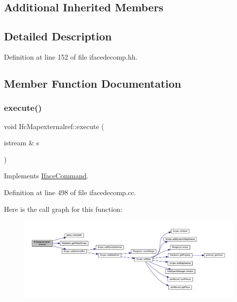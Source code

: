 \subsection*{Additional Inherited Members}


\subsection{Detailed Description}


Definition at line 152 of file ifacedecomp.\+hh.



\subsection{Member Function Documentation}
\mbox{\label{class_ifc_mapexternalref_a81048b8beac5fa5bfd987a4ac3a5b6b1}} 
\subsubsection{\texorpdfstring{execute()}{execute()}}
{\footnotesize\ttfamily void Ifc\+Mapexternalref\+::execute (\begin{DoxyParamCaption}\item[{istream \&}]{s }\end{DoxyParamCaption})\hspace{0.3cm}{\ttfamily [virtual]}}



Implements \mbox{\hyperlink{class_iface_command_af10e29cee2c8e419de6efe9e680ad201}{Iface\+Command}}.



Definition at line 498 of file ifacedecomp.\+cc.

Here is the call graph for this function\+:
\nopagebreak
\begin{figure}[H]
\begin{center}
\leavevmode
\includegraphics[width=350pt]{class_ifc_mapexternalref_a81048b8beac5fa5bfd987a4ac3a5b6b1_cgraph}
\end{center}
\end{figure}


